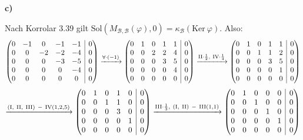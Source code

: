 \documentclass[a4paper,graphics,11pt]{article}
\begin{document}
\textbf{c)}

Nach Korrolar 3.39 gilt $\text{Sol}(M_{\mathcal{B}, \mathcal{B}}(\varphi), 0) = \kappa_{\mathcal{B}}(\text{Ker}\ \varphi)$. Also:
$$
    \begin{array}({@{}ccccc|c@{}})
        0 & -1 & 0 & -1 & -1 & 0\\
        0 & 0 & -2 & -2 & -4 & 0\\
        0 & 0 & 0 & -3 & -5 & 0\\
        0 & 0 & 0 & 0 & -4 & 0\\
        0 & 0 & 0 & 0 & 0 & 0\\
    \end{array}
    \xrightarrow {\forall \cdot(-1)}
    \begin{array}({@{}ccccc|c@{}})
        0 & 1 & 0 & 1 & 1 & 0\\
        0 & 0 & 2 & 2 & 4 & 0\\
        0 & 0 & 0 & 3 & 5 & 0\\
        0 & 0 & 0 & 0 & 4 & 0\\
        0 & 0 & 0 & 0 & 0 & 0\\
    \end{array}
    \xrightarrow {\text{II}\cdot \frac{1}{2},\ \text{IV}\cdot \frac{1}{4}}
    \begin{array}({@{}ccccc|c@{}})
        0 & 1 & 0 & 1 & 1 & 0\\
        0 & 0 & 1 & 1 & 2 & 0\\
        0 & 0 & 0 & 3 & 5 & 0\\
        0 & 0 & 0 & 0 & 1 & 0\\
        0 & 0 & 0 & 0 & 0 & 0\\
    \end{array}
$$$$
    \xrightarrow {(\text{I},\ \text{II},\ \text{III})\ -\ \text{IV}(1, 2, 5)}
    \begin{array}({@{}ccccc|c@{}})
        0 & 1 & 0 & 1 & 0 & 0\\
        0 & 0 & 1 & 1 & 0 & 0\\
        0 & 0 & 0 & 3 & 0 & 0\\
        0 & 0 & 0 & 0 & 1 & 0\\
        0 & 0 & 0 & 0 & 0 & 0\\
    \end{array}
    \xrightarrow {\text{III}\cdot \frac{1}{3},\ (\text{I},\ \text{II})\ -\ \text{III}(1,1)}
    \begin{array}({@{}ccccc|c@{}})
        0 & 1 & 0 & 0 & 0 & 0\\
        0 & 0 & 1 & 0 & 0 & 0\\
        0 & 0 & 0 & 1 & 0 & 0\\
        0 & 0 & 0 & 0 & 1 & 0\\
        0 & 0 & 0 & 0 & 0 & 0\\
    \end{array}
$$
\end{document}

